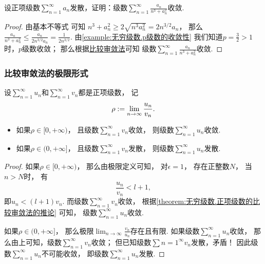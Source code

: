 \begin{example}
设正项级数\(\sum_{n=1}^\infty a_n\)发散，证明：级数\(\sum_{n=1}^\infty \frac{a_n}{n^3+a_n^2}\)收敛.
\begin{proof}
由基本不等式  可知
\(n^3+a_n^2\geq2\sqrt{n^3 a_n^2}=2n^{3/2}a_n\)，
那么\(\frac{a_n}{n^3+a_n^2}\leq\frac{a_n}{2n^{3/2}a_n}=\frac{1}{2n^{3/2}}\).
由\cref{example:无穷级数.p级数的收敛性}
我们知道\(p=\frac{3}{2}>1\)时，\(p\)级数收敛；
那么根据\hyperref[theorem:无穷级数.正项级数的比较审敛法]{比较审敛法}可知
级数\(\sum_{n=1}^\infty \frac{a_n}{n^3+a_n^2}\)收敛.
\end{proof}
\end{example}

\subsubsection{比较审敛法的极限形式}
\begin{theorem}[比较审敛法的极限形式]\label{theorem:无穷级数.正项级数的比较审敛法的极限形式}
设\(\sum_{n=1}^\infty u_n\)和\(\sum_{n=1}^\infty v_n\)都是正项级数，
记\[
	\rho
	:=
	\lim_{n\to\infty} \frac{u_n}{v_n}.
\]
\begin{itemize}
	\item 如果\(\rho\in[0,+\infty)\)，
	且级数\(\sum_{n=1}^\infty v_n\)收敛，
	则级数\(\sum_{n=1}^\infty u_n\)收敛.

	\item 如果\(\rho\in(0,+\infty]\)，
	且级数\(\sum_{n=1}^\infty v_n\)发散，
	则级数\(\sum_{n=1}^\infty u_n\)发散.
\end{itemize}
\begin{proof}
如果\(\rho\in[0,+\infty)\)，
那么由极限定义可知，
对\(\epsilon=1\)，
存在正整数\(N\)，
当\(n>N\)时，
有\[
	\frac{u_n}{v_n} < l+1,
\]
即\(u_n < (l+1) v_n\).
而级数\(\sum_{n=1}^\infty v_n\)收敛，
根据\cref{theorem:无穷级数.正项级数的比较审敛法的推论} 可知，
级数\(\sum_{n=1}^\infty u_n\)收敛.

如果\(\rho\in(0,+\infty]\)，
那么极限\(\lim_{n\to\infty} \frac{v_n}{u_n}\)存在且有限.
如果级数\(\sum_{n=1}^\infty u_n\)收敛，
那么由上可知，级数\(\sum_{n=1}^\infty v_n\)收敛；
但已知级数\(\sum\limits{n=1}^\infty v_n\)发散，矛盾！
因此级数\(\sum_{n=1}^\infty u_n\)不可能收敛，
即级数\(\sum_{n=1}^\infty u_n\)发散.
\end{proof}
\end{theorem}

